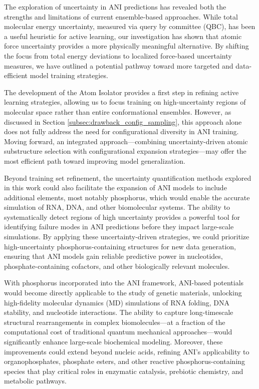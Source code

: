The exploration of uncertainty in ANI predictions has revealed both the strengths and limitations of current ensemble-based approaches. While total molecular energy uncertainty, measured via query by committee (QBC), has been a useful heuristic for active learning, our investigation has shown that atomic force uncertainty provides a more physically meaningful alternative. By shifting the focus from total energy deviations to localized force-based uncertainty measures, we have outlined a potential pathway toward more targeted and data-efficient model training strategies.

The development of the Atom Isolator provides a first step in refining active learning strategies, allowing us to focus training on high-uncertainty regions of molecular space rather than entire conformational ensembles. However, as discussed in Section \ref{subsec:drawback_config_sampling}, this approach alone does not fully address the need for configurational diversity in ANI training. Moving forward, an integrated approach—combining uncertainty-driven atomic substructure selection with configurational expansion strategies—may offer the most efficient path toward improving model generalization.

Beyond training set refinement, the uncertainty quantification methods explored in this work could also facilitate the expansion of ANI models to include additional elements, most notably phosphorus, which would enable the accurate simulation of RNA, DNA, and other biomolecular systems. The ability to systematically detect regions of high uncertainty provides a powerful tool for identifying failure modes in ANI predictions before they impact large-scale simulations. By applying these uncertainty-driven strategies, we could prioritize high-uncertainty phosphorus-containing structures for new data generation, ensuring that ANI models gain reliable predictive power in nucleotides, phosphate-containing cofactors, and other biologically relevant molecules.

With phosphorus incorporated into the ANI framework, ANI-based potentials would become directly applicable to the study of genetic materials, unlocking high-fidelity molecular dynamics (MD) simulations of RNA folding, DNA stability, and nucleotide interactions. The ability to capture long-timescale structural rearrangements in complex biomolecules—at a fraction of the computational cost of traditional quantum mechanical approaches—would significantly enhance large-scale biochemical modeling. Moreover, these improvements could extend beyond nucleic acids, refining ANI’s applicability to organophosphates, phosphate esters, and other reactive phosphorus-containing species that play critical roles in enzymatic catalysis, prebiotic chemistry, and metabolic pathways.

